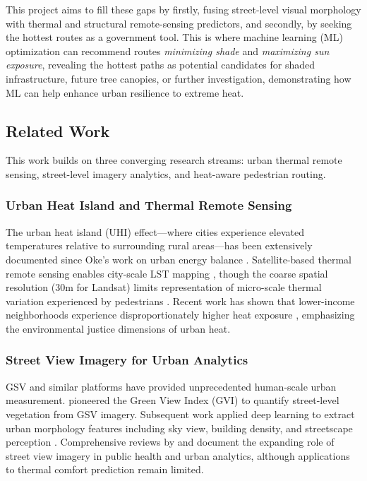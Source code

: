 \documentclass[
]{article}
\begin{document}
This project aims to fill these gaps by firstly, fusing street-level visual morphology with thermal and structural remote-sensing predictors, and secondly, by seeking the hottest routes as a government tool. This is where machine learning (ML) optimization can recommend routes \emph{minimizing shade} and \emph{maximizing sun exposure}, revealing the hottest paths as potential candidates for shaded infrastructure, future tree canopies, or further investigation, demonstrating how ML can help enhance urban resilience to extreme heat.

\subsection{Related Work}
\label{subsec:related-work}

This work builds on three converging research streams: urban thermal remote sensing, street-level imagery analytics, and heat-aware pedestrian routing.

\subsubsection{Urban Heat Island and Thermal Remote Sensing}
\label{subsubsec:uhi}

The urban heat island (UHI) effect---where cities experience elevated temperatures relative to surrounding rural areas---has been extensively documented since Oke's work on urban energy balance \citep{oke1982}. Satellite-based thermal remote sensing enables city-scale LST mapping \citep{voogt2003}, though the coarse spatial resolution (30m for Landsat) limits representation of micro-scale thermal variation experienced by pedestrians \citep{ho2014}. Recent work has shown that lower-income neighborhoods experience disproportionately higher heat exposure \citep{chakraborty2019}, emphasizing the environmental justice dimensions of urban heat.

\subsubsection{Street View Imagery for Urban Analytics}
\label{subsubsec:street-view}

GSV and similar platforms have provided unprecedented human-scale urban measurement. \citet{li2015} pioneered the Green View Index (GVI) to quantify street-level vegetation from GSV imagery. Subsequent work applied deep learning to extract urban morphology features including sky view, building density, and streetscape perception \citep{middel2019, zhang2019}. Comprehensive reviews by \citet{kang2020} and \citet{biljecki2021} document the expanding role of street view imagery in public health and urban analytics, although applications to thermal comfort prediction remain limited.
\end{document}
